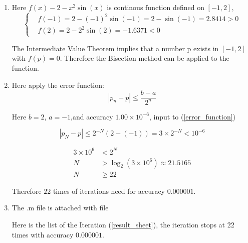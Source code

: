 \begin{solution}\ \\
\begin{enumerate}[label=(\alph*)]
	\item
Here $f(x)-2-x^2 \sin(x)$ is continous function defined on $[-1,2]$,
\begin{equation}
	\left \{
	\begin{aligned}
		&f(-1)=2-(-1)^2 \sin(-1)=2-\sin(-1)=2.8414>0\\
		&f(2)=2-2^2 \sin (2)=-1.6371<0
	\end{aligned}
	\right.
\end{equation}

The Intermediate Value Theorem implies that a number p exists in $[-1,2]$ with $f(p) = 0$. Therefore the Bisection method can be applied to the function.

\item

Here apply the error function:
\begin{equation}
	\left|p_{n}-p\right| \leq \frac{b-a}{2^{n}} \label{error_function}
\end{equation}

Here $b=2$, $a=-1$,and accuracy $1.00 \times 10^{-6}$, input to (\ref{error_function})


\begin{equation*}
	\left|p_{N}-p\right| \leq 2^{-N}(2-(-1))=3 \times 2^{-N}<10^{-6}
\end{equation*}

\begin{equation*}
\begin{aligned}
	3 \times 10^6&<2^N\\
	N&> \log_2(3 \times 10^6) \approx 21.5165\\
	N& \geq 22
\end{aligned}	
\end{equation*}

Therefore $22$ times of iterations need for accuracy $0.000001$. 

\item The .m file is attached with file



Here is the list of the Iteration (\ref{result_sheet}), the iteration stops at 22 times with accuracy $0.000001$.




\end{enumerate}
\end{solution}

